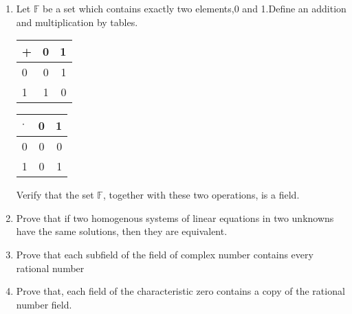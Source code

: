 \begin{enumerate}[label=\thesubsection.\arabic*.,ref=\thesubsection.\theenumi]
\item Let $\mathbb{F}$ be a set which contains exactly two elements,0 and 1.Define an addition and multiplication by tables.
\begin{table}[h!]
  \begin{center}
    \label{eq:solutions/1/1/5/tab:table1}
    \begin{tabular}{l|c|r}
      + & 0 & 1 \\
      \hline
      0 & 0 & 1\\
      1 & 1 & 0
    \end{tabular}
  \end{center}
\end{table}
\begin{table}[h!]
  \begin{center}
    \label{eq:solutions/1/1/5/tab:table2}
    \begin{tabular}{l|c|r}
      $\cdot$ & 0 & 1 \\
      \hline
      0 & 0 & 0\\
      1 & 0 & 1
    \end{tabular}
  \end{center}
\end{table}
  Verify that the set $\mathbb{F}$, together with these two operations, is a field.
%
\\
\solution

\item Prove that if two homogenous systems of linear equations in two unknowns have the same solutions, then they are equivalent.
\\
\solution

\item Prove that each subfield of the field of complex number contains every rational number
\\
\solution

%
\item Prove that, each field of the characteristic zero contains a copy of the rational number field.
\\
\solution

\end{enumerate}


